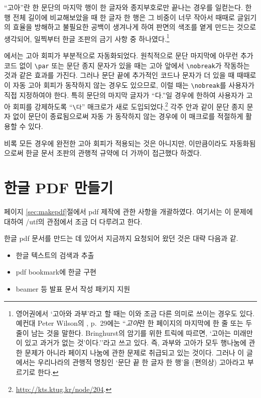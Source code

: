 ``고아''란 한 문단의 마지막 행이 한 글자와 종지부호로만 끝나는 경우를
일컫는다. 한 행 전체 길이에 비교해보았을 때 한 글자 한 행은 그 비중이
너무 작아서 때때로 글읽기의 효율을 방해하고 불필요한 공백이 생겨나게 하여
판면의 색조를 옅게 만드는 것으로 생각되어, 일찍부터 한글 조판의
금기 사항 중 하나였다.\footnote{%
  영어권에서 `고아와 과부'라고 할 때는 이와 조금 다른 의미로 쓰이는
  경우도 있다. 예컨대 Peter Wilson의 \cite{memman}, p.~29에는
  ``\emph{고아}란 한 페이지의 마지막에 한 줄 또는 두 줄이 남는 것을 말한다. 
  Bringhurst의 암기를 위한 트릭에 따르면,
  `고아는 미래만이 있고 과거가 없는 것'이다.''라고 쓰고 있다.
  즉, 과부와 고아가 모두 행나눔에 관한 문제가 아니라
  페이지 나눔에 관한 문제로 취급되고 있는 것이다. 그러나
  이 글에서는 우리나라의 관행적 명칭인 `문단 끝 한 글자 한 행'을 (편의상)
  고아라고 부르기로 한다. 
}

\kotex 에서는 고아 회피가 부분적으로 자동화되었다. 원칙적으로
문단 마지막에 아무런 추가 코드 없이 \verb|\par| 또는 문단 종지 문자가
있을 때는 고아 앞에서 \verb|\nobreak|가 작동하는 것과 같은 효과를
가진다. 그러나 문단 끝에 추가적인 코드나 문자가 더 있을 때 때때로
이 자동 고아 회피가 동작하지 않는 경우도 있으므로, 이럴 때는 
\texttt{\textbackslash nobreak}를
사용자가 직접 지정하여야 한다. 특히 문단의 마지막 글자가 ``다.''일 경우에
한하여 사용자가 고아 회피를 강제하도록 ``\verb|\다|'' 매크로가
새로 도입되었다.\footnote{%
  \url{http://kts.ktug.kr/node/204}.
}
각주 안과 같이 문단 종지 문자 없이 문단이 종료됨으로써
자동 가 동작하지 않는 경우에
이 매크로를 적절하게 활용할 수 있다.

비록 모든 경우에 완전한 고아 회피가 적용되는 것은 아니지만, 
이만큼이라도 자동화됨으로써 한글 문서 조판의 관행적 규약에 더 가까이
접근했다 하겠다.

\section{한글 PDF 만들기}\label{sec:pdf}

\pageref{sec:makepdf} 페이지 \ref{sec:makepdf}절에서
pdf 제작에 관한 사항을 개괄하였다. 여기서는 이 문제에 대하여
\kotex/utf의 관점에서 조금 더 다루려고 한다. 

한글 pdf 문서를 만드는 데 있어서 지금까지 요청되어 왔던 것은 대략
다음과 같\다.
\begin{itemize}
\item 한글 텍스트의 검색과 추출
\item pdf bookmark에 한글 구현
\item beamer 등 발표 문서 작성 패키지 지원
\end{itemize}

